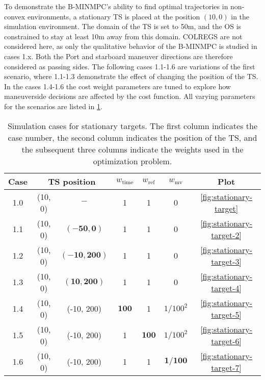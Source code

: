 To demonstrate the B-MINMPC's ability to find optimal trajectories in non-convex environments, a stationary TS is placed at the position $(10, 0)$ in the simulation environment. The domain of the TS is set to 50m, and the OS is constrained to stay at least 10m away from this domain. COLREGS are not considered here, as only the qualitative behavior of the B-MINMPC is studied in cases 1.x. Both the Port and starboard maneuver directions are therefore considered as passing sides. The following cases 1.1-1.6 are variations of the first scenario, where 1.1-1.3 demonstrate the effect of changing the position of the TS. In the cases 1.4-1.6 the cost weight parameters are tuned to explore how maneuverside decisions are affected by the cost function. 
All varying parameters for the scenarios are listed in \cref{tab:stationary-targets}.


\begin{table}
    \centering
    \begin{tabular}{|c|c|c|c|c|c|c|}
        \hline
        Case & \multicolumn{2}{c|}{TS position} & $w_\text{time}$ & $w_\text{ref}$ & $w_\text{mv}$ & Plot \\
        \hline
        1.0 & (10, 0) & $-$ & 1 & 1 & 0 & \cref{fig:stationary-target} \\
        \hline
        1.1 & (10, 0) & $\mathbf{(-50, 0)}$ & 1 & 1 & 0 & \cref{fig:stationary-target-2} \\
        \hline
        1.2 & (10, 0) & $\mathbf{(-10, 200)}$ & 1 & 1 & 0 & \cref{fig:stationary-target-3} \\
        \hline
        1.3 & (10, 0) & $\mathbf{(10, 200)}$ & 1 & 1 & 0 & \cref{fig:stationary-target-4} \\
        \hline
        1.4 & (10, 0) & (-10, 200) & $\mathbf{100}$ & 1 & $1/100^2$ & \cref{fig:stationary-target-5} \\
        \hline
        1.5 & (10, 0) & (-10, 200) & 1 & $\mathbf{100}$ & $1/100^2$ & \cref{fig:stationary-target-6} \\
        \hline
        1.6 & (10, 0) & (-10, 200) & 1 & 1 & $\mathbf{1/100}$ & \cref{fig:stationary-target-7} \\
        \hline
    \end{tabular}
    \caption{Simulation cases for stationary targets. The first column indicates the case number, the second column indicates the position of the TS, and the subsequent three columns indicate the weights used in the optimization problem.}
    \label{tab:stationary-targets}
\end{table}


